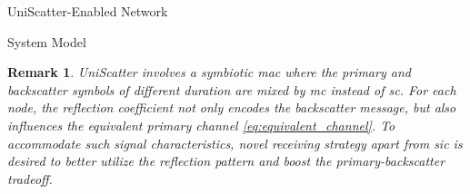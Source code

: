\documentclass[journal]{IEEEtran}
\newtheorem{remark}{Remark}
\begin{document}
\begin{section}{UniScatter-Enabled Network}
\begin{subsection}{System Model}


		\begin{remark}
			UniScatter involves a symbiotic \gls{mac} where the primary and backscatter symbols of different duration are mixed by \gls{mc} instead of \gls{sc}.
			For each node, the reflection coefficient not only encodes the backscatter message, but also influences the equivalent primary channel \eqref{eq:equivalent_channel}.
			To accommodate such signal characteristics, novel receiving strategy apart from \gls{sic} is desired to better utilize the reflection pattern and boost the primary-backscatter tradeoff.
		\end{remark}
	\end{subsection}


\end{section}
\end{document}
